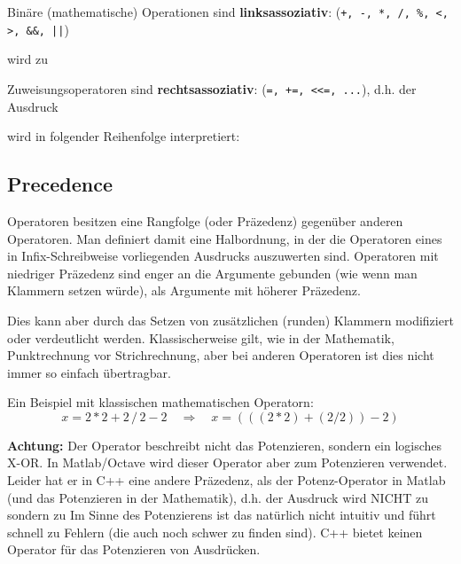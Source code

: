 \begin{example}
Binäre (mathematische) Operationen sind \textbf{linksassoziativ}: (\texttt{+, -, *, /, \%, <, >, \&\&, ||})

 wird zu 
\end{example}

\begin{example}
Zuweisungsoperatoren sind  \textbf{rechtsassoziativ}:  (\texttt{=, +=, <<=, ...}), d.h. der Ausdruck

 wird in folgender Reihenfolge interpretiert: 
\end{example}

\subsection{Precedence\label{sec:operator-precedence}}
Operatoren besitzen eine Rangfolge (oder Präzedenz) gegenüber anderen Operatoren. Man definiert damit eine Halbordnung, in der die Operatoren eines in Infix-Schreibweise vorliegenden Ausdrucks auszuwerten sind. Operatoren mit niedriger Präzedenz sind enger an die Argumente gebunden (wie wenn man Klammern setzen würde), als Argumente mit höherer Präzedenz.

Dies kann aber durch das Setzen von zusätzlichen (runden) Klammern modifiziert oder verdeutlicht werden. Klassischerweise gilt, wie in der Mathematik, Punktrechnung vor Strichrechnung, aber bei anderen Operatoren ist dies nicht immer so einfach übertragbar.

\begin{example}
  Ein Beispiel mit klassischen mathematischen Operatorn:
\[
x = 2 * 2 + 2\, /\, 2 - 2\quad\Rightarrow\quad x = \left(\left(\left(2 * 2\right) + \left(2 / 2\right)\right) - 2\right)
\]
\end{example}

\begin{example}
\textbf{Achtung:} Der Operator \cpp{^} beschreibt nicht das Potenzieren, sondern ein logisches X-OR. In Matlab/Octave wird dieser Operator aber zum Potenzieren verwendet. Leider hat er in C++ eine andere Präzedenz, als der Potenz-Operator in Matlab (und das Potenzieren in der Mathematik), d.h. der Ausdruck
wird NICHT zu
sondern zu
Im Sinne des Potenzierens ist das natürlich nicht intuitiv und führt schnell zu Fehlern (die auch noch schwer zu finden sind). C++ bietet keinen Operator für das Potenzieren von Ausdrücken.
\end{example}


